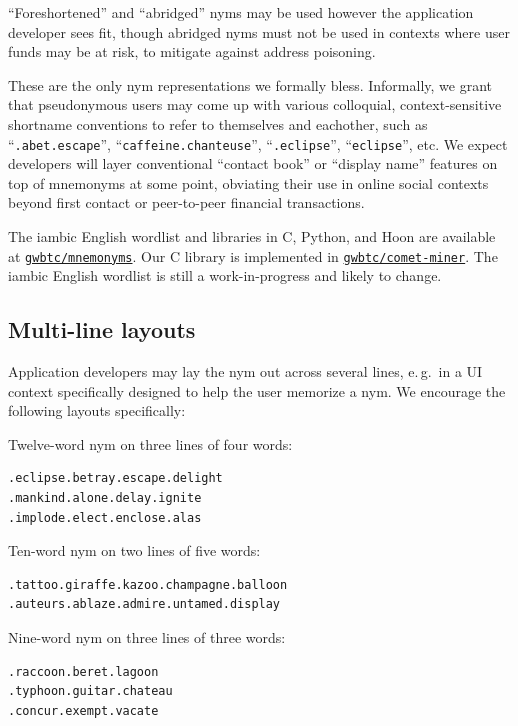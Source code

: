 \documentclass[twoside]{article}
\begin{document}
``Foreshortened'' and ``abridged'' nyms may be used however the
application developer sees fit, though abridged nyms must not be used in
contexts where user funds may be at risk, to mitigate against address poisoning.

These are the only nym representations we formally bless. Informally, we
grant that pseudonymous users may come up with various colloquial,
context-sensitive shortname conventions to refer to themselves and
eachother, such as ``\texttt{.abet.escape}'', ``\texttt{caffeine.chanteuse}'',
``\texttt{.eclipse}'', ``\texttt{eclipse}'', etc. We expect developers will layer
conventional ``contact book'' or ``display name'' features on top of
mnemonyms at some point, obviating their use in online social contexts
beyond first contact or peer-to-peer financial transactions.

The iambic English wordlist and libraries in C, Python, and Hoon are available at
\href{https://github.com/gwbtc/mnemonyms}{\texttt{gwbtc/mnemonyms}}. Our C library is implemented in
\href{https://github.com/gwbtc/comet-miner}{\texttt{gwbtc/comet-miner}}. The
iambic English wordlist is still a work-in-progress and likely to change.

\subsection{Multi-line layouts}\label{multi-line-layouts}

Application developers may lay the nym out across several lines, e.\,g.\ in
a UI context specifically designed to help the user memorize a nym. We
encourage the following layouts specifically:

Twelve-word nym on three lines of four words:

\begin{lstlisting}[style=listingcode]
.eclipse.betray.escape.delight
.mankind.alone.delay.ignite
.implode.elect.enclose.alas
\end{lstlisting}

Ten-word nym on two lines of five words:

\begin{lstlisting}[style=listingcode]
.tattoo.giraffe.kazoo.champagne.balloon
.auteurs.ablaze.admire.untamed.display
\end{lstlisting}

Nine-word nym on three lines of three words:

\begin{lstlisting}[style=listingcode]
.raccoon.beret.lagoon
.typhoon.guitar.chateau
.concur.exempt.vacate
\end{lstlisting}
\end{document}
